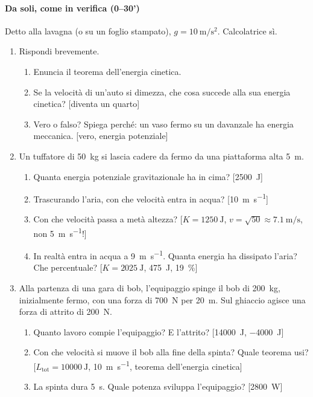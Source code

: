 \documentclass[11pt]{report}
\begin{document}
\paragraph{Da soli, come in verifica (0--30')}
Detto alla lavagna (o su un foglio stampato), $g=\SI{10}{\metre\per\second\squared}$. Calcolatrice sì.
\begin{enumerate}
  \item Rispondi brevemente.
  \begin{enumerate}
    \item Enuncia il teorema dell'energia cinetica.
    \item Se la velocità di un'auto si dimezza, che cosa succede alla sua energia cinetica? [diventa un quarto]
    \item Vero o falso? Spiega perché: un vaso fermo su un davanzale ha energia meccanica. [vero, energia potenziale]
  \end{enumerate}
  \item Un tuffatore di \SI{50}{\kilogram} si lascia cadere da fermo da una piattaforma alta \SI{5}{\metre}.
  \begin{enumerate}
    \item Quanta energia potenziale gravitazionale ha in cima? [\SI{2500}{\joule}]
    \item Trascurando l'aria, con che velocità entra in acqua? [\SI{10}{\metre\per\second}]
    \item Con che velocità passa a metà altezza? [$K=\SI{1250}{\joule}$, $v=\sqrt{50}\approx\SI{7.1}{\metre\per\second}$, non \SI{5}{\metre\per\second}!]
    \item In realtà entra in acqua a \SI{9}{\metre\per\second}. Quanta energia ha dissipato l'aria? Che percentuale? [$K=\SI{2025}{\joule}$, \SI{475}{\joule}, \SI{19}{\percent}]
  \end{enumerate}
  \item Alla partenza di una gara di bob, l'equipaggio spinge il bob di \SI{200}{\kilogram}, inizialmente fermo, con una forza di \SI{700}{\newton} per \SI{20}{\metre}. Sul ghiaccio agisce una forza di attrito di \SI{200}{\newton}.
  \begin{enumerate}
    \item Quanto lavoro compie l'equipaggio? E l'attrito? [\SI{14000}{\joule}, \SI{-4000}{\joule}]
    \item Con che velocità si muove il bob alla fine della spinta? Quale teorema usi? [$L_{\text{tot}}=\SI{10000}{\joule}$, \SI{10}{\metre\per\second}, teorema dell'energia cinetica]
    \item La spinta dura \SI{5}{\second}. Quale potenza sviluppa l'equipaggio? [\SI{2800}{\watt}]

\end{enumerate}
\end{enumerate}
\end{document}
